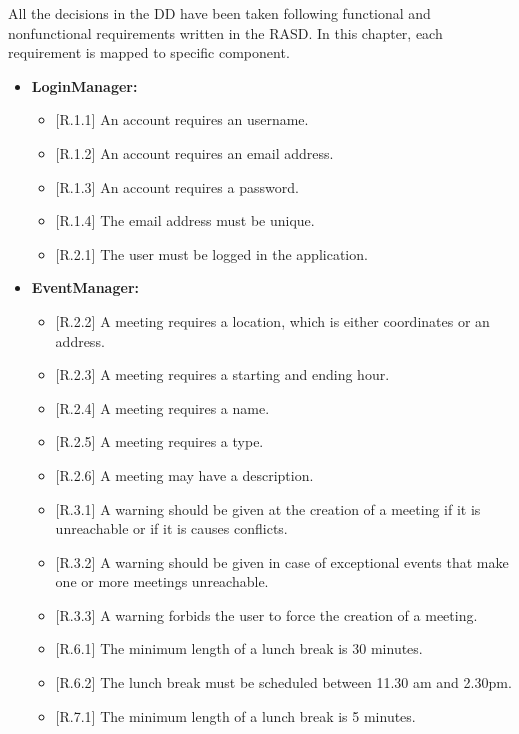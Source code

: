 All the decisions in the DD have been taken following functional and nonfunctional requirements written in the RASD. In this chapter, each requirement is mapped to specific component.
\\
\begin{itemize}

\item
\textbf{LoginManager:}
\begin{itemize}
\item
$[$R.1.1$]$ An account requires an username.
\item
$[$R.1.2$]$ An account requires an email address.
\item 
$[$R.1.3$]$ An account requires a password.
\item
$[$R.1.4$]$ The email address must be unique.
\item
$[$R.2.1$]$ The user must be logged in the application.
\end{itemize}

\item
\textbf{EventManager:}
\begin{itemize}
\item
$[$R.2.2$]$ A meeting requires a location, which is either coordinates or an address.
\item
$[$R.2.3$]$ A meeting requires a starting and ending hour.
\item
$[$R.2.4$]$ A meeting requires a name.
\item
$[$R.2.5$]$ A meeting requires a type.
\item
$[$R.2.6$]$ A meeting may have a description.
\item
$[$R.3.1$]$ A warning should be given at the creation of a meeting if it is unreachable or if
it is causes conflicts.
\item
$[$R.3.2$]$ A warning should be given in case of exceptional events that make one or more
meetings unreachable.
\item
$[$R.3.3$]$ A warning forbids the user to force the creation of a meeting.
\item
$[$R.6.1$]$ The minimum length of a lunch break is 30 minutes.
\item
$[$R.6.2$]$ The lunch break must be scheduled between 11.30 am and 2.30pm.
\item
$[$R.7.1$]$ The minimum length of a lunch break is 5 minutes.
\end{itemize}


\end{itemize}
